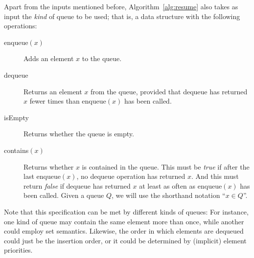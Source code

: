 \documentclass[paper=letter,fontsize=11pt,captions=tableheading]{scrartcl}
\numberwithin{equation}{section}
\theoremstyle{algorithm}
\theoremstyle{plain}
\theoremstyle{nonumberplain}
\begin{document}
Apart from the inputs mentioned before, Algorithm~\ref{alg:resume} also takes as input the \emph{kind} of queue to be used; that is, a data structure with the following operations:
\begin{description}
	\item[enqueue$(x)$] Adds an element $x$ to the queue.
	\item[dequeue] Returns an element $x$ from the queue, provided that dequeue has returned $x$ fewer times than enqueue$(x)$ has been called.
	\item[isEmpty] Returns whether the queue is empty.
	\item[contains$(x)$] Returns whether $x$ is contained in the queue. This must be \emph{true} if after the last enqueue$(x)$, no dequeue operation has returned $x$. And this must return \emph{false} if dequeue has returned $x$ at least as often as enqueue$(x)$ has been called. Given a queue $Q$, we will use the shorthand notation ``$x \in Q$''.
\end{description}
%
Note that this specification can be met by different kinds of queues: For instance, one kind of queue may contain the same element more than once, while another could employ set semantics. Likewise, the order in which elements are dequeued could just be the insertion order, or it could be determined by (implicit) element priorities.
\end{document}
